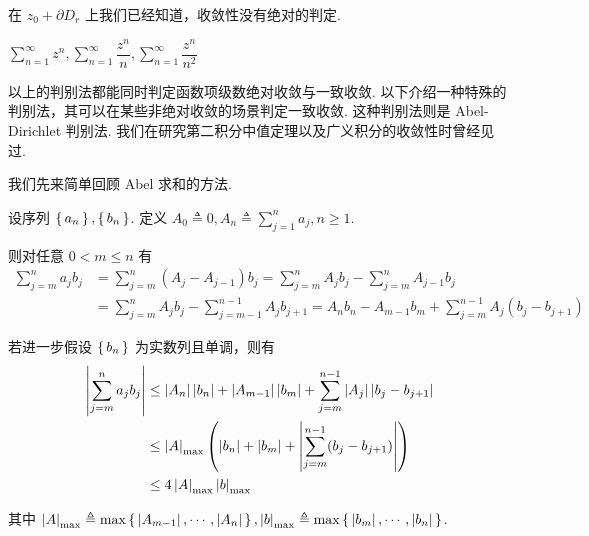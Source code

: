 \begin{hint}
    在 $z_0+\partial D_r$ 上我们已经知道，收敛性没有绝对的判定.
\end{hint}

\begin{example}
    $\sum\limits_{n=1}^\infty z^n,\sum\limits_{n=1}^\infty\dfrac{z^n}{n},\sum\limits_{n=1}^\infty\dfrac{z^n}{n^2}$
\end{example}


以上的判别法都能同时判定函数项级数绝对收敛与一致收敛. 以下介绍一种特殊的判别法，其可以在某些非绝对收敛的场景判定一致收敛. 这种判别法则是 Abel-Dirichlet 判别法. 我们在研究第二积分中值定理以及广义积分的收敛性时曾经见过.

我们先来简单回顾 Abel 求和的方法.

设序列 $\set{a_n},\set{b_n}$. 定义 $A_0\triangleq 0,A_n\triangleq\sum\limits_{j=1}^na_j,n\ge 1$.

则对任意 $0<m\le n$ 有
$$
\begin{aligned}
    \sum_{j=m}^na_jb_j&=\sum_{j=m}^n(A_j-A_{j-1})b_j=\sum_{j=m}^nA_jb_j-\sum_{j=m}^nA_{j-1}b_j\\
    &=\sum_{j=m}^nA_jb_j-\sum_{j=m-1}^{n-1}A_jb_{j+1}=A_nb_n-A_{m-1}b_m+\sum_{j=m}^{n-1}A_j(b_j-b_{j+1})
\end{aligned}
$$

若进一步假设 $\set{b_n}$ 为实数列且单调，则有
$$
\begin{aligned}
    \left\lvert{\sum_{j=m}^na_jb_j}\right\rvert&\le\left\lvert{A_n}\right\rvert\left\lvert{b_n}\right\rvert+\left\lvert{A_{m-1}}\right\rvert\left\lvert{b_m}\right\rvert+\sum_{j=m}^{n-1}\left\lvert{A_j}\right\rvert\left\lvert{b_j-b_{j+1}}\right\rvert\\
    &\le\left\lvert{A}\right\rvert_\textrm{max}\left(\left\lvert{b_n}\right\rvert+\left\lvert{b_m}\right\rvert+\left\lvert{\sum_{j=m}^{n-1}(b_j-b_{j+1})}\right\rvert\right)\\
    &\le 4\left\lvert{A}\right\rvert_\textrm{max}\left\lvert{b}\right\rvert_\textrm{max}
\end{aligned}
$$

其中 $\left\lvert{A}\right\rvert_\textrm{max}\triangleq\max\set{\left\lvert{A_{m-1}}\right\rvert,\cdots,\left\lvert{A_n}\right\rvert},\left\lvert{b}\right\rvert_\textrm{max}\triangleq\max\set{\left\lvert{b_m}\right\rvert,\cdots,\left\lvert{b_n}\right\rvert}$.